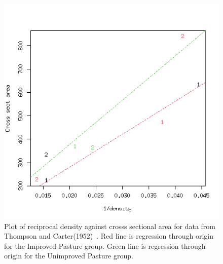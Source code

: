 %

\begin{figure}[h]
  \centering
   \includegraphics[width=1.1\textwidth]{C19391951/breedxpasture.png}
  \caption{Plot of reciprocal density against crosss sectional area for data from Thompson and Carter(1952)~\cite{thom:52}. Red line is regression through origin for the Improved Pasture group. Green line is regression through origin for the Unimproved Pasture group.}
  \label{fig:cart52}
\end{figure}

%

